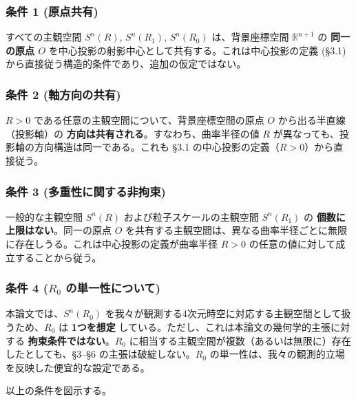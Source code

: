 \documentclass[
  a4paper,11pt]{ltjsarticle}
\begin{document}
\subsubsection{条件 1
(原点共有)}\label{ux6761ux4ef6-1-ux539fux70b9ux5171ux6709}

すべての主観空間 \(S^n(R)\), \(S^n(R_1)\), \(S^n(R_0)\) は、背景座標空間
\(\mathbb{R}^{n+1}\) の \textbf{同一の原点 \(O\)}
を中心投影の射影中心として共有する。これは中心投影の定義 (§3.1)
から直接従う構造的条件であり、追加の仮定ではない。

\subsubsection{条件 2
(軸方向の共有)}\label{ux6761ux4ef6-2-ux8ef8ux65b9ux5411ux306eux5171ux6709}

\(R > 0\) である任意の主観空間について、背景座標空間の原点 \(O\)
から出る半直線（投影軸）の
\textbf{方向は共有される}。すなわち、曲率半径の値 \(R\)
が異なっても、投影軸の方向構造は同一である。これも §3.1
の中心投影の定義（\(R > 0\)）から直接従う。

\subsubsection{条件 3
(多重性に関する非拘束)}\label{ux6761ux4ef6-3-ux591aux91cdux6027ux306bux95a2ux3059ux308bux975eux62d8ux675f}

一般的な主観空間 \(S^n(R)\) および粒子スケールの主観空間 \(S^n(R_1)\) の
\textbf{個数に上限はない}。同一の原点 \(O\)
を共有する主観空間は、異なる曲率半径ごとに無限に存在しうる。これは中心投影の定義が曲率半径
\(R > 0\) の任意の値に対して成立することから従う。

\subsubsection{\texorpdfstring{条件 4 (\(R_0\)
の単一性について)}{条件 4 (R\_0 の単一性について)}}\label{ux6761ux4ef6-4-r_0-ux306eux5358ux4e00ux6027ux306bux3064ux3044ux3066}

本論文では、\(S^n(R_0)\)
を我々が観測する4次元時空に対応する主観空間として扱うため、\(R_0\) は
\textbf{1つを想定} している。ただし、これは本論文の幾何学的主張に対する
\textbf{拘束条件ではない}。\(R_0\)
に相当する主観空間が複数（あるいは無限に）存在したとしても、§3--§6
の主張は破綻しない。\(R_0\)
の単一性は、我々の観測的立場を反映した便宜的な設定である。

以上の条件を図示する。
\end{document}
